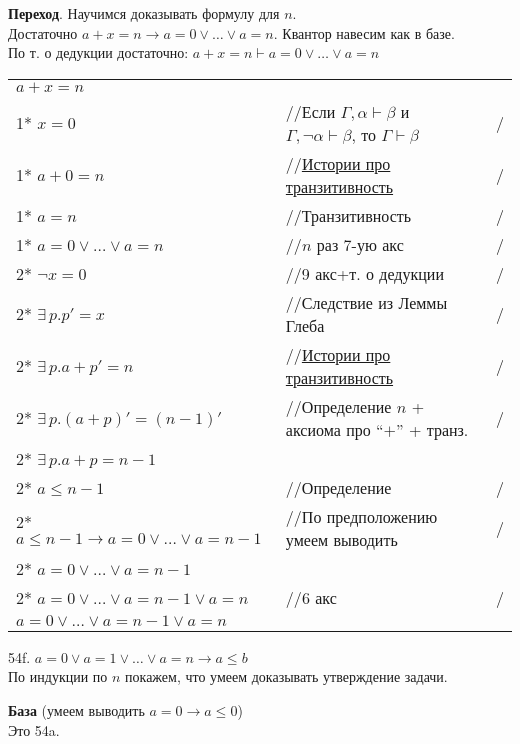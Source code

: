 \documentclass[12pt]{article}
\begin{document}
{\bf Переход}. Научимся доказывать формулу для $n$.\\
Достаточно $a+x=n\to a=0\vee\ldots\vee a=n$. Квантор навесим как в базе.\\
По т. о дедукции достаточно: $a+x=n\vdash a=0\vee\ldots\vee a=n$\\
\begin{tabular*}{\textwidth}{l l l}
	$a+x=n$&&\\
	1* $x=0$&//Если $\Gamma,\alpha\vdash\beta$ и $\Gamma,\neg\alpha\vdash\beta$, то $\Gamma\vdash\beta$&/\\
	1* $a+0=n$&//\hyperlink{tratsit_stories}{Истории про транзитивность}&/\\
	1* $a=n$&//Транзитивность&/\\
	1* $a=0\vee\ldots\vee a=n$&//$n$ раз $7$-ую акс&/\\
	2* $\neg x=0$&//9 акс+т. о дедукции&/\\
	2* $\exists\,p.p'=x$&//Следствие из Леммы Глеба&/\\
	2* $\exists\,p.a+p'=n$&//\hyperlink{tratsit_stories}{Истории про транзитивность}&/\\
	2* $\exists\,p.(a+p)'=(n-1)'$&//Определение $n$ + аксиома про ``$+$'' + транз.&/\\
	2* $\exists\,p.a+p=n-1$&&\\
	2* $a\leqslant n-1$&//Определение&/\\
	2* $a\leqslant n-1\to a=0\vee\ldots\vee a=n-1$&//По предположению умеем выводить&/\\
	2* $a=0\vee\ldots\vee a=n-1$&&\\
	2* $a=0\vee\ldots\vee a=n-1\vee a=n$&//$6$ акс&/\\
	$a=0\vee\ldots\vee a=n-1\vee a=n$
\end{tabular*}

\bigskip

54f. $a=0\vee a=1\vee\ldots\vee a=n\to a\leqslant b$\\
По индукции по $n$ покажем, что умеем доказывать утверждение задачи.

{\bf База} (умеем выводить $a=0\to a\leqslant 0$)\\
Это 54a.
\end{document}
